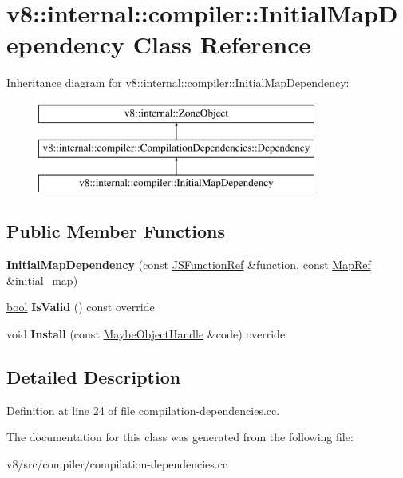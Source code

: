 \hypertarget{classv8_1_1internal_1_1compiler_1_1InitialMapDependency}{}\section{v8\+:\+:internal\+:\+:compiler\+:\+:Initial\+Map\+Dependency Class Reference}
\label{classv8_1_1internal_1_1compiler_1_1InitialMapDependency}
Inheritance diagram for v8\+:\+:internal\+:\+:compiler\+:\+:Initial\+Map\+Dependency\+:\begin{figure}[H]
\begin{center}
\leavevmode
\includegraphics[height=3.000000cm]{classv8_1_1internal_1_1compiler_1_1InitialMapDependency}
\end{center}
\end{figure}
\subsection*{Public Member Functions}
\begin{DoxyCompactItemize}
\item 
\mbox{\label{classv8_1_1internal_1_1compiler_1_1InitialMapDependency_a1efd62ad0b2df6b9dedc8561740b1ca7}} 
{\bfseries Initial\+Map\+Dependency} (const \mbox{\hyperlink{classv8_1_1internal_1_1compiler_1_1JSFunctionRef}{J\+S\+Function\+Ref}} \&function, const \mbox{\hyperlink{classv8_1_1internal_1_1compiler_1_1MapRef}{Map\+Ref}} \&initial\+\_\+map)
\item 
\mbox{\label{classv8_1_1internal_1_1compiler_1_1InitialMapDependency_a958ace5896c02cfc866123a406f7828f}} 
\mbox{\hyperlink{classbool}{bool}} {\bfseries Is\+Valid} () const override
\item 
\mbox{\label{classv8_1_1internal_1_1compiler_1_1InitialMapDependency_a3c44dab4f90c3eb3da6b9aed682b7bf8}} 
void {\bfseries Install} (const \mbox{\hyperlink{classv8_1_1internal_1_1MaybeObjectHandle}{Maybe\+Object\+Handle}} \&code) override
\end{DoxyCompactItemize}


\subsection{Detailed Description}


Definition at line 24 of file compilation-\/dependencies.\+cc.



The documentation for this class was generated from the following file\+:\begin{DoxyCompactItemize}
\item 
v8/src/compiler/compilation-\/dependencies.\+cc\end{DoxyCompactItemize}
